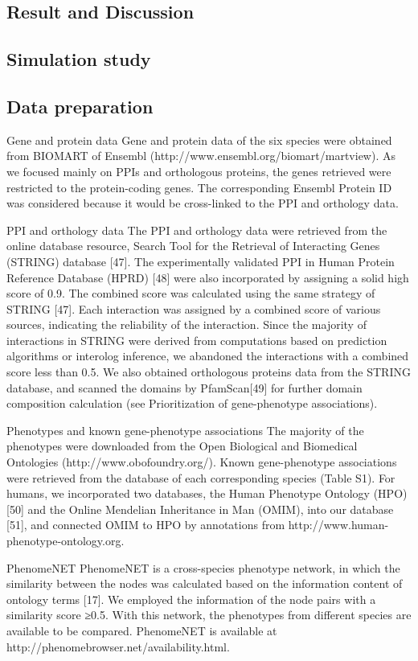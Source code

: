 \documentclass{bioinfo}
\begin{document}
\begin{result}
\section{Result and Discussion}
\subsection{Simulation study}
\subsection{Data preparation}
Gene and protein data
Gene and protein data of the six species were obtained from BIOMART of Ensembl (http://www.ensembl.org/biomart/martview). As we focused mainly on PPIs and orthologous proteins, the genes retrieved were restricted to the protein-coding genes. The corresponding Ensembl Protein ID was considered because it would be cross-linked to the PPI and orthology data.

PPI and orthology data
The PPI and orthology data were retrieved from the online database resource, Search Tool for the Retrieval of Interacting Genes (STRING) database [47]. The experimentally validated PPI in Human Protein Reference Database (HPRD) [48] were also incorporated by assigning a solid high score of 0.9. The combined score was calculated using the same strategy of STRING [47]. Each interaction was assigned by a combined score of various sources, indicating the reliability of the interaction. Since the majority of interactions in STRING were derived from computations based on prediction algorithms or interolog inference, we abandoned the interactions with a combined score less than 0.5. We also obtained orthologous proteins data from the STRING database, and scanned the domains by PfamScan[49] for further domain composition calculation (see Prioritization of gene-phenotype associations).

Phenotypes and known gene-phenotype associations
The majority of the phenotypes were downloaded from the Open Biological and Biomedical Ontologies (http://www.obofoundry.org/). Known gene-phenotype associations were retrieved from the database of each corresponding species (Table S1). For humans, we incorporated two databases, the Human Phenotype Ontology (HPO)[50] and the Online Mendelian Inheritance in Man (OMIM), into our database [51], and connected OMIM to HPO by annotations from http://www.human-phenotype-ontology.org.

PhenomeNET
PhenomeNET is a cross-species phenotype network, in which the similarity between the nodes was calculated based on the information content of ontology terms [17]. We employed the information of the node pairs with a similarity score ≥0.5. With this network, the phenotypes from different species are available to be compared. PhenomeNET is available at http://phenomebrowser.net/availability.html.
\end{result}
\end{document}
